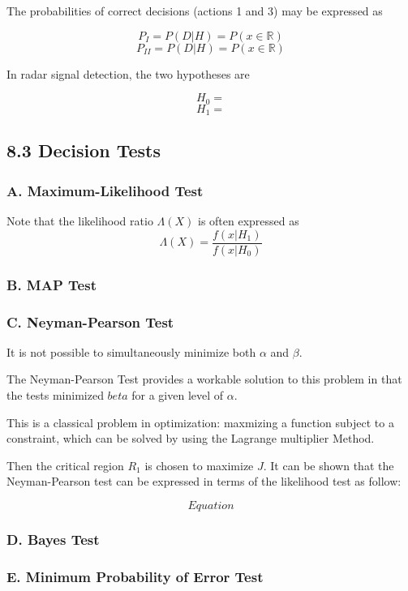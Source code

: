 
The probabilities of correct decisions (actions 1 and 3) may be expressed as

\[ P_{I} = P(D|H) = P(x \in \mathbb{R}) \]
\[ P_{II} = P(D|H) = P(x \in \mathbb{R}) \]

In radar signal detection, the two hypotheses are

\[ H_0 = \]
\[ H_1 = \]

\subsection*{8.3 Decision Tests}

\subsubsection*{A. Maximum-Likelihood Test}

Note that the likelihood ratio $\Lambda(X)$ is often expressed as
\[ \Lambda(X) =  \frac{f(x|H_1)}{f(x|H_0)} \]
\subsubsection*{B. MAP Test}

\subsubsection*{C. Neyman-Pearson Test}

It is not possible to simultaneously minimize both $\alpha$ and $\beta$.

The Neyman-Pearson Test provides a workable solution to this problem in that the tests minimized $beta$ for a given level of $\alpha$.

This is a classical problem in optimization: maxmizing a function subject to a constraint, which can be solved by using the Lagrange multiplier Method.


Then the critical region $R_1$ is chosen to maximize $J$. It can be shown that the Neyman-Pearson test can be expressed in terms of the likelihood test as follow:

\[  Equation \]

\subsubsection*{D. Bayes Test}


\subsubsection*{E. Minimum Probability of Error Test}


